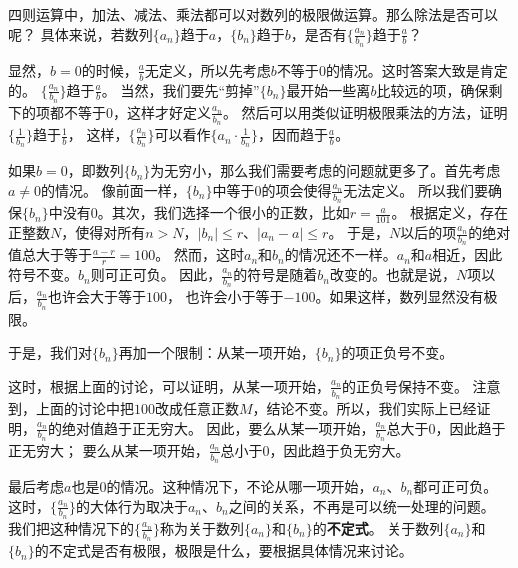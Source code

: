 \documentclass[12pt,UTF8]{ctexbook}
\begin{document}
四则运算中，加法、减法、乘法都可以对数列的极限做运算。那么除法是否可以呢？
具体来说，若数列$\{a_n\}$趋于$a$，$\{b_n\}$趋于$b$，是否有$\{\frac{a_n}{b_n}\}$趋于$\frac{a}{b}$？

显然，$b=0$的时候，$\frac{a}{b}$无定义，所以先考虑$b$不等于$0$的情况。这时答案大致是肯定的。
$\{\frac{a_n}{b_n}\}$趋于$\frac{a}{b}$。
当然，我们要先“剪掉”$\{b_n\}$最开始一些离$b$比较远的项，确保剩下的项都不等于$0$，这样才好定义$\frac{a_n}{b_n}$。
然后可以用类似证明极限乘法的方法，证明$\{\frac{1}{b_n}\}$趋于$\frac{1}{b}$，
这样，$\{\frac{a_n}{b_n}\}$可以看作$\{a_n \cdot \frac{1}{b_n}\}$，因而趋于$\frac{a}{b}$。

如果$b=0$，即数列$\{b_n\}$为无穷小，那么我们需要考虑的问题就更多了。首先考虑$a\neq 0$的情况。
像前面一样，$\{b_n\}$中等于$0$的项会使得$\frac{a_n}{b_n}$无法定义。
所以我们要确保$\{b_n\}$中没有$0$。其次，我们选择一个很小的正数，比如$r=\frac{a}{101}$。
根据定义，存在正整数$N$，使得对所有$n>N$，$|b_n| \leqslant r$、$|a_n - a| \leqslant r$。
于是，$N$以后的项$\frac{a_n}{b_n}$的绝对值总大于等于$\frac{a - r}{r} = 100$。
然而，这时$a_n$和$b_n$的情况还不一样。$a_n$和$a$相近，因此符号不变。$b_n$则可正可负。
因此，$\frac{a_n}{b_n}$的符号是随着$b_n$改变的。也就是说，$N$项以后，$\frac{a_n}{b_n}$也许会大于等于$100$，
也许会小于等于$-100$。如果这样，数列显然没有极限。

于是，我们对$\{b_n\}$再加一个限制：从某一项开始，$\{b_n\}$的项正负号不变。

这时，根据上面的讨论，可以证明，从某一项开始，$\frac{a_n}{b_n}$的正负号保持不变。
注意到，上面的讨论中把$100$改成任意正数$M$，结论不变。所以，我们实际上已经证明，$\frac{a_n}{b_n}$的绝对值趋于正无穷大。
因此，要么从某一项开始，$\frac{a_n}{b_n}$总大于$0$，因此趋于正无穷大；
要么从某一项开始，$\frac{a_n}{b_n}$总小于$0$，因此趋于负无穷大。

最后考虑$a$也是$0$的情况。这种情况下，不论从哪一项开始，$a_n$、$b_n$都可正可负。
这时，$\{\frac{a_n}{b_n}\}$的大体行为取决于$a_n$、$b_n$之间的关系，不再是可以统一处理的问题。
我们把这种情况下的$\{\frac{a_n}{b_n}\}$称为关于数列$\{a_n\}$和$\{b_n\}$的\textbf{不定式}。
关于数列$\{a_n\}$和$\{b_n\}$的不定式是否有极限，极限是什么，要根据具体情况来讨论。
\end{document}
